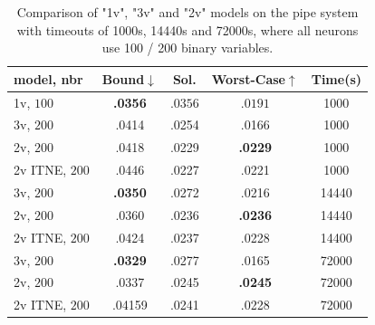 	
	\vspace*{1ex}
	

	
		
	\begin{table}[h!]
	\begin{tabular}{||l||c|c|c|c||}\hline\hline
		model, nbr&        Bound$\downarrow$ &  Sol. &      Worst-Case$\uparrow$ &  Time(s) \\\hline \hline
		1v, $100$ &     {\bf .0356} &  $.0356$ & $.0191$ &  1000 \\\hline
		3v, $200$&     .0414 &  .0254 &  .0166 &  1000 \\\hline
		2v, $200$&     .0418 &  .0229 &   {\bf .0229} &  1000 \\\hline 
		2v ITNE, $200$&  .0446  & .0227 &  .0221  &  1000 \\\hline\hline
		3v, $200$&      {\bf .0350} &  .0272 &  .0216 & 14440 \\\hline
		2v, $200$&     .0360 &  .0236 &    {\bf .0236} & 14440 \\\hline 
		2v ITNE, $200$& .0424  &  .0237  & .0228   &  14400 \\\hline\hline
		3v, $200$&     {\bf .0329} &  .0277 &  .0165 & 72000 \\\hline
		2v, $200$&     .0337 &  .0245 &  {\bf .0245} & 72000 \\\hline
		2v ITNE, $200$&  .04159 & .0241 &  .0228  &  72000 \\\hline\hline
	\end{tabular}
	\caption{Comparison of "1v", "3v" and "2v" models on the pipe system with timeouts of 1000s, 14440s and 72000s, where all neurons use 100 / 200 binary variables.}
	\label{table.pipe}
\end{table}

